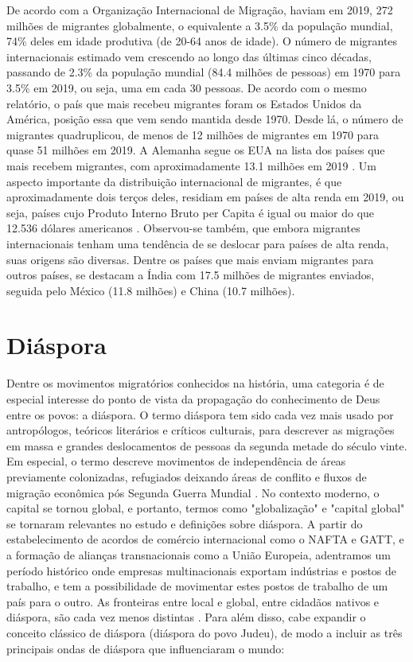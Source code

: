 \documentclass[12pt,openright,oneside,a4paper,
english,french,spanish,brazil]{abntex2}
\begin{document}
De acordo com a Organização Internacional de Migração, haviam em 2019, 272 milhões de migrantes globalmente, o equivalente a 3.5\% da população mundial, 74\% deles em idade produtiva (de 20-64 anos de idade). O número de migrantes internacionais estimado vem crescendo ao longo das últimas cinco décadas, passando de 2.3\% da população mundial (84.4 milhões de pessoas) em 1970 para 3.5\% em 2019, ou seja, uma em cada 30 pessoas. De acordo com o mesmo relatório, o país que mais recebeu migrantes foram os Estados Unidos da América, posição essa que vem sendo mantida desde 1970. Desde lá, o número de migrantes quadruplicou, de menos de 12 milhões de migrantes em 1970 para quase 51 milhões em 2019. A Alemanha segue os EUA na lista dos países que mais recebem migrantes, com aproximadamente 13.1 milhões em 2019 \cite[p. 21]{iom2020}. Um aspecto importante da distribuição internacional de migrantes, é que aproximadamente dois terços deles, residiam em países de alta renda em 2019, ou seja, países cujo Produto Interno Bruto per Capita é igual ou maior do que 12.536 dólares americanos \cite{world_bank_country_lending_groups}. Observou-se também, que embora migrantes internacionais tenham uma tendência de se deslocar para países de alta renda, suas origens são diversas.  Dentre os países que mais enviam migrantes para outros países, se destacam a Índia com 17.5 milhões de migrantes enviados, seguida pelo México (11.8 milhões) e China (10.7 milhões). 

\section{Diáspora}

Dentre os movimentos migratórios conhecidos na história, uma categoria é de especial interesse do ponto de vista da propagação do conhecimento de Deus entre os povos: a diáspora. O termo diáspora tem sido cada vez mais usado por antropólogos, teóricos literários e críticos culturais, para descrever as migrações em massa e grandes deslocamentos de pessoas da segunda metade do século vinte. Em especial, o termo descreve movimentos de independência de áreas previamente colonizadas, refugiados deixando áreas de conflito e fluxos de migração econômica pós Segunda Guerra Mundial \cite[p. 11]{braziel}. No contexto moderno, o capital se tornou global, e portanto, termos como "globalização" e "capital global" se tornaram relevantes no estudo e definições sobre diáspora. A partir do estabelecimento de acordos de comércio internacional como o NAFTA e GATT, e a formação de alianças transnacionais como a União Europeia, adentramos um período histórico onde empresas multinacionais exportam indústrias e postos de trabalho, e tem a possibilidade de movimentar estes postos de trabalho de um país para o outro. As fronteiras entre local e global, entre cidadãos nativos e diáspora, são cada vez menos distintas \cite[p. 19]{braziel}. Para além disso, cabe expandir o conceito clássico de diáspora (diáspora do povo Judeu), de modo a incluir as três principais ondas de diáspora que influenciaram o mundo: 
\end{document}
